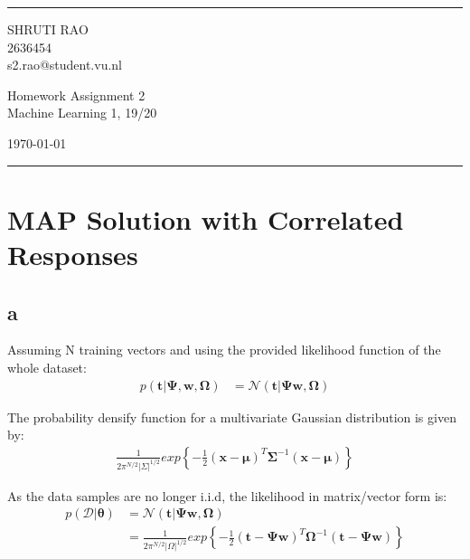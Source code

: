 \documentclass[a4paper]{article}
\begin{document}

\fancyhead[C]{}
\hrule \medskip %
\begin{minipage}{0.295\textwidth} 
\raggedright
\footnotesize
SHRUTI RAO \hfill\\   
2636454 \hfill\\
s2.rao@student.vu.nl
\end{minipage}
\begin{minipage}{0.4\textwidth} 
\centering 
\large 
Homework Assignment 2\\ 
\normalsize 
Machine Learning 1, 19/20\\ 
\end{minipage}
\begin{minipage}{0.295\textwidth} 
\raggedleft
\today\hfill\\
\end{minipage}
\medskip\hrule 
\bigskip


\section*{MAP Solution with Correlated Responses}
\subsection*{a}
Assuming N training vectors and using the provided likelihood function of the whole dataset:
\begin{align*}
    p(\textbf{t}| \pmb{\Psi}, \textbf{w}, \pmb{\Omega}) &= \mathcal{N}(\textbf{t} |\pmb{\Psi}\textbf{w}, \pmb{\Omega})
\end{align*}{}

The probability densify function for a multivariate Gaussian distribution is given by:
\begin{align*}
    \frac{1}{2\pi^{N/2}|\Sigma|^{1/2}}exp \left\{-\frac{1}{2}(\pmb{x}-\pmb{\mu})^{T}\pmb{\Sigma}^{-1}(\pmb{x}-\pmb{\mu}) \right\}
\end{align*}{}

As the data samples are no longer i.i.d, the likelihood in matrix/vector form is:
\begin{align*}
    p(\mathcal{D}|\pmb{\theta}) &= \mathcal{N}(\textbf{t} |\pmb{\Psi}\textbf{w}, \pmb{\Omega}) \\
    &= \frac{1}{2\pi^{N/2}|\Omega|^{1/2}}exp\left\{-\frac{1}{2}(\pmb{t}-\pmb{\Psi w})^{T}\pmb{\Omega}^{-1}(\pmb{t}-\pmb{\Psi w}) \right\}
\end{align*}{}
\end{document}
